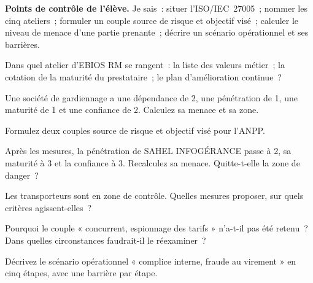 \begin{boxinfo}
\textbf{Points de contrôle de l'élève.} Je sais~: situer l'ISO/IEC~27005~;
nommer les cinq ateliers~; formuler un couple source de risque et objectif
visé~; calculer le niveau de menace d'une partie prenante~; décrire un
scénario opérationnel et ses barrières.
\end{boxinfo}

\bigskip

\begin{boxexo}[title={\ding{45}\quad Exercice~8.1. Les ateliers \niveaubase}]
Dans quel atelier d'EBIOS RM se rangent~: la liste des valeurs métier~; la
cotation de la maturité du prestataire~; le plan d'amélioration continue~?
\end{boxexo}

\begin{boxexo}[title={\ding{45}\quad Exercice~8.2. Calculer la menace \niveaubase}]
Une société de gardiennage a une dépendance de 2, une pénétration de 1,
une maturité de 1 et une confiance de 2. Calculez sa menace et sa zone.
\end{boxexo}

\begin{boxexo}[title={\ding{45}\quad Exercice~8.3. Les couples \niveaubase}]
Formulez deux couples source de risque et objectif visé pour l'ANPP.
\end{boxexo}

\begin{boxexo}[title={\ding{45}\quad Exercice~8.4. Recoter le prestataire \niveaumoyen}]
Après les mesures, la pénétration de SAHEL INFOGÉRANCE passe à 2, sa
maturité à 3 et la confiance à 3. Recalculez sa menace. Quitte-t-elle la
zone de danger~?
\end{boxexo}

\begin{boxexo}[title={\ding{45}\quad Exercice~8.5. Les transporteurs \niveaumoyen}]
Les transporteurs sont en zone de contrôle. Quelles mesures proposer, sur
quels critères agissent-elles~?
\end{boxexo}

\begin{boxexo}[title={\ding{45}\quad Exercice~8.6. Écarter \niveaumoyen}]
Pourquoi le couple « concurrent, espionnage des tarifs » n'a-t-il pas été
retenu~? Dans quelles circonstances faudrait-il le réexaminer~?
\end{boxexo}

\begin{boxexo}[title={\ding{45}\quad Exercice~8.7. Un scénario opérationnel \niveaumoyen}]
Décrivez le scénario opérationnel « complice interne, fraude au
virement » en cinq étapes, avec une barrière par étape.
\end{boxexo}

